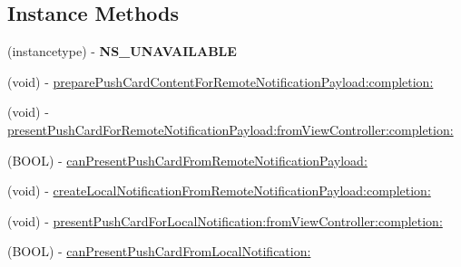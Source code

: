 \subsection*{Instance Methods}
\begin{DoxyCompactItemize}
\item 
\hypertarget{interface_f_b_notifications_manager_a2cdca76fda69d18dc055c09c8fb49f4a}{}(instancetype) -\/ {\bfseries N\+S\+\_\+\+U\+N\+A\+V\+A\+I\+L\+A\+B\+L\+E}\label{interface_f_b_notifications_manager_a2cdca76fda69d18dc055c09c8fb49f4a}

\item 
(void) -\/ \hyperlink{interface_f_b_notifications_manager_aeb90c6f3581f32e6c5b2b3ca23a7c39a}{prepare\+Push\+Card\+Content\+For\+Remote\+Notification\+Payload\+:completion\+:}
\begin{DoxyCompactList}\small\item\em 

 \end{DoxyCompactList}\item 
(void) -\/ \hyperlink{interface_f_b_notifications_manager_a001f7ea8d80a0a612fd3ee8eb7a04cc5}{present\+Push\+Card\+For\+Remote\+Notification\+Payload\+:from\+View\+Controller\+:completion\+:}
\item 
(B\+O\+O\+L) -\/ \hyperlink{interface_f_b_notifications_manager_af37f5c674af62149c51ecb587ce83887}{can\+Present\+Push\+Card\+From\+Remote\+Notification\+Payload\+:}
\item 
(void) -\/ \hyperlink{interface_f_b_notifications_manager_a799d0670fb473f7a5e7bd759b68ca787}{create\+Local\+Notification\+From\+Remote\+Notification\+Payload\+:completion\+:}
\begin{DoxyCompactList}\small\item\em 

 \end{DoxyCompactList}\item 
(void) -\/ \hyperlink{interface_f_b_notifications_manager_a1c6bb5bdbbfe387454b86b20848dafa0}{present\+Push\+Card\+For\+Local\+Notification\+:from\+View\+Controller\+:completion\+:}
\item 
(B\+O\+O\+L) -\/ \hyperlink{interface_f_b_notifications_manager_ac479f10ae4c5d38a19aec399dff54994}{can\+Present\+Push\+Card\+From\+Local\+Notification\+:}
\end{DoxyCompactItemize}
